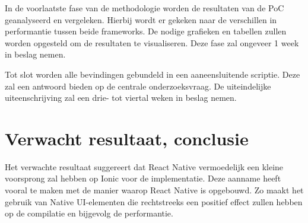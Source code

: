 In de voorlaatste fase van de methodologie worden de resultaten van de PoC geanalyseerd en vergeleken. Hierbij wordt er gekeken naar de verschillen in performantie tussen beide frameworks. De nodige grafieken en tabellen zullen worden opgesteld om de resultaten te visualiseren. Deze fase zal ongeveer 1 week in beslag nemen.

Tot slot worden alle bevindingen gebundeld in een aaneensluitende scriptie. Deze zal een antwoord bieden op de centrale onderzoeksvraag. De uiteindelijke uiteenschrijving zal een drie- tot viertal weken in beslag nemen.

\section{Verwacht resultaat, conclusie}%
\label{sec:verwachte_resultaten}

Het verwachte resultaat suggereert dat React Native vermoedelijk een kleine voorsprong zal hebben op Ionic voor de implementatie. Deze aanname heeft vooral te maken met de manier waarop React Native is opgebouwd. Zo maakt het gebruik van Native UI-elementen die rechtstreeks een positief effect zullen hebben op de compilatie en bijgevolg de performantie. 

